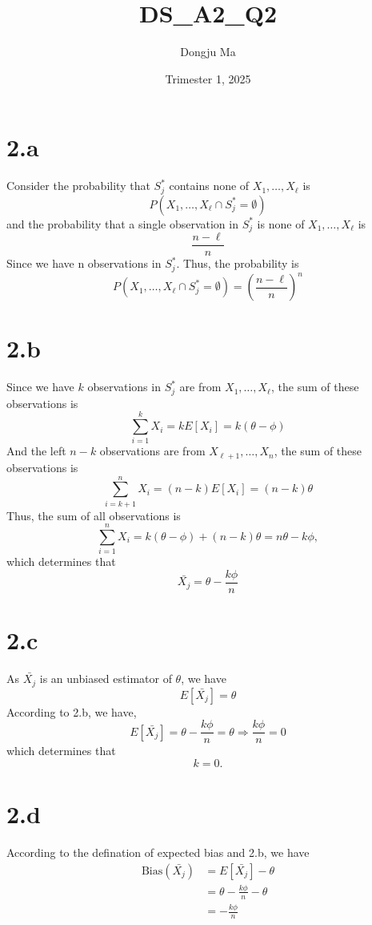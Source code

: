 \documentclass{article}
\title{DS\_A2\_Q2}
\author{Dongju Ma}
\date{Trimester 1, 2025}
\begin{document}
\maketitle

\section*{2.a}
Consider the probability that \(S_j^{*}\) contains none of \(X_1, \dots, X_\ell\) is 
\[
    P({X_1, \dots, X_\ell} \cap S_j^{*} = \emptyset)
\] 
and the probability that a single observation in \(S_j^{*}\) is none of \(X_1, \dots, X_\ell\) is
\[
    \frac{n-\ell}{n}
\]
Since we have n observations in \(S_j^{*}\).
Thus, the probability is
\[
    P({X_1, \dots, X_\ell} \cap S_j^{*} = \emptyset) = \left( \frac{n-\ell}{n} \right)^n
\]

\section*{2.b}
Since we have \(k\) observations in \(S_j^{*}\) are from \(X_1, \dots, X_\ell\), the sum of these observations is
\[
    \sum_{i=1}^{k} X_i = k E[X_i] = k (\theta - \phi )
\]
And the left \(n-k\) observations are from \(X_{\ell+1}, \dots, X_n\), the sum of these observations is
\[
    \sum_{i=k+1}^{n} X_i = (n-k) E[X_i] = (n-k) \theta
\]
Thus, the sum of all observations is
\[
    \sum_{i=1}^{n} X_i = k (\theta - \phi) + (n-k) \theta = n \theta - k \phi,
\]
which determines that
\[
    \bar{X_j} = \theta - \frac{k \phi} {n}
\]

\section*{2.c}
As \(\bar{X_j}\) is an unbiased estimator of \(\theta\), we have
\[
    E[\bar{X_j}] = \theta
\]
According to 2.b, we have,
\[
    E[\bar{X_j}] = \theta - \frac{k \phi} {n} = \theta \Rightarrow \frac{k \phi}{n} = 0 
\]
which determines that
\[
    k = 0.
\]

\section*{2.d}
According to the defination of expected bias and 2.b, we have
\begin{align*}
    \text{Bias}(\bar{X_j}) &= E[\bar{X_j}] - \theta \\
    &= \theta - \frac{k \phi} {n} - \theta \\
    &= - \frac{k \phi} {n}
\end{align*}
\end{document}
